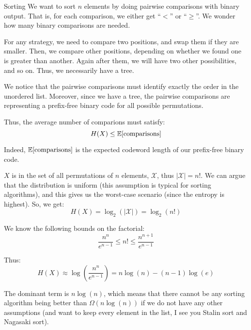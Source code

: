 \documentclass[a4paper]{article}
\begin{document}
\begin{parag}{Sorting}
    We want to sort $n$ elements by doing pairwise comparisons with binary output. That is, for each comparison, we either get ``$<$'' or ``$\geq$''. We wonder how many binary comparisons are needed.

   For any strategy, we need to compare two positions, and swap them if they are smaller. Then, we compare other positions, depending on whether we found one is greater than another. Again after them, we will have two other possibilities, and so on. Thus, we necessarily have a tree.

   We notice that the pairwise comparisons must identify exactly the order in the unordered list. Moreover, since we have a tree, the pairwise comparisons are representing a prefix-free binary code for all possible permutations.

   Thus, the average number of comparions must satisfy:
   \[H\left(X\right) \leq \exval\left[\text{comparisons}\right]\]

   Indeed, $\exval\left[\text{comparisons}\right]$ is the expected codeword length of our prefix-free binary code.

   $X$ is in the set of all permutations of $n$ elements, $\mathcal{X}$, thus $\left|\mathcal{X}\right| = n!$. We can argue that the distribution is uniform (this assumption is typical for sorting algorithms), and this gives us the worst-case scenario (since the entropy is highest). So, we get:
   \[H\left(X\right) = \log_2\left(\left|\mathcal{X}\right|\right) = \log_2\left(n!\right)\]

   We know the following bounds on the factorial:
   \[\frac{n^n}{e^{n-1}} \leq n! \leq \frac{n^{n+1}}{e^{n-1}}\]

   Thus:
   \[H\left(X\right) \approx \log\left(\frac{n^n}{e^{n-1}}\right) = n\log\left(n\right) - \left(n-1\right)\log\left(e\right)\]

   The dominant term is $n\log\left(n\right)$, which means that there cannot be any sorting algorithm being better than $\Omega\left(n\log\left(n\right)\right)$ if we do not have any other assumptions (and want to keep every element in the list, I see you Stalin sort and Nagasaki sort).
\end{parag}
\end{document}
